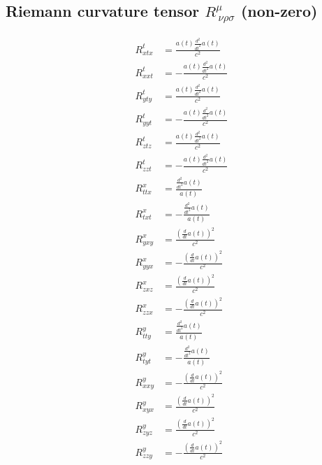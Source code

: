 \documentclass{article}
\begin{document}
\subsection{Riemann curvature tensor $R^{\mu}_{\ \nu\rho\sigma}$ (non-zero)}
\begin{align}
R^{t}_{x t x} &= \frac{a{\left(t \right)} \frac{d^{2}}{d t^{2}} a{\left(t \right)}}{c^{2}} \\ 
R^{t}_{x x t} &= - \frac{a{\left(t \right)} \frac{d^{2}}{d t^{2}} a{\left(t \right)}}{c^{2}} \\ 
R^{t}_{y t y} &= \frac{a{\left(t \right)} \frac{d^{2}}{d t^{2}} a{\left(t \right)}}{c^{2}} \\ 
R^{t}_{y y t} &= - \frac{a{\left(t \right)} \frac{d^{2}}{d t^{2}} a{\left(t \right)}}{c^{2}} \\ 
R^{t}_{z t z} &= \frac{a{\left(t \right)} \frac{d^{2}}{d t^{2}} a{\left(t \right)}}{c^{2}} \\ 
R^{t}_{z z t} &= - \frac{a{\left(t \right)} \frac{d^{2}}{d t^{2}} a{\left(t \right)}}{c^{2}} \\ 
R^{x}_{t t x} &= \frac{\frac{d^{2}}{d t^{2}} a{\left(t \right)}}{a{\left(t \right)}} \\ 
R^{x}_{t x t} &= - \frac{\frac{d^{2}}{d t^{2}} a{\left(t \right)}}{a{\left(t \right)}} \\ 
R^{x}_{y x y} &= \frac{\left(\frac{d}{d t} a{\left(t \right)}\right)^{2}}{c^{2}} \\ 
R^{x}_{y y x} &= - \frac{\left(\frac{d}{d t} a{\left(t \right)}\right)^{2}}{c^{2}} \\ 
R^{x}_{z x z} &= \frac{\left(\frac{d}{d t} a{\left(t \right)}\right)^{2}}{c^{2}} \\ 
R^{x}_{z z x} &= - \frac{\left(\frac{d}{d t} a{\left(t \right)}\right)^{2}}{c^{2}} \\ 
R^{y}_{t t y} &= \frac{\frac{d^{2}}{d t^{2}} a{\left(t \right)}}{a{\left(t \right)}} \\ 
R^{y}_{t y t} &= - \frac{\frac{d^{2}}{d t^{2}} a{\left(t \right)}}{a{\left(t \right)}} \\ 
R^{y}_{x x y} &= - \frac{\left(\frac{d}{d t} a{\left(t \right)}\right)^{2}}{c^{2}} \\ 
R^{y}_{x y x} &= \frac{\left(\frac{d}{d t} a{\left(t \right)}\right)^{2}}{c^{2}} \\ 
R^{y}_{z y z} &= \frac{\left(\frac{d}{d t} a{\left(t \right)}\right)^{2}}{c^{2}} \\ 
R^{y}_{z z y} &= - \frac{\left(\frac{d}{d t} a{\left(t \right)}\right)^{2}}{c^{2}} \\ 

\end{align}
\end{document}

